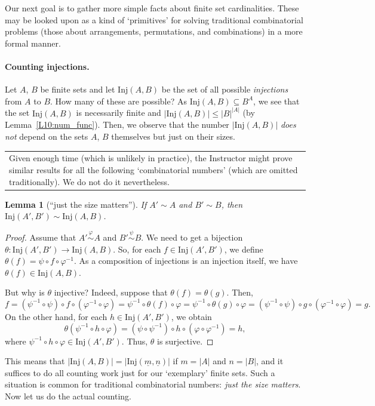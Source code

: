 \documentclass[12pt,notitlepage]{article}
\theoremstyle{plain}
\newtheorem{lemma}[thm]{Lemma}
\theoremstyle{definition}
\theoremstyle{plain}
\newcommand{\sbs}{\subseteq}
\renewcommand{\phi}{\varphi}
\newcommand{\ul}[1]{\underline{#1}}
\newcommand{\1}{\mathbf{1}}
\newcommand{\0}{\mathbf{0}}
\newcommand{\mcomm}[1]{
\medskip\noindent\begin{tabular}{| l}
\parbox{0.99\textwidth}{{\small
#1 }}\end{tabular}
\smallskip}
\begin{document}
Our next goal is to gather more simple facts about finite set cardinalities. These may be looked upon as a kind of `primitives' for solving traditional combinatorial problems (those about arrangements, permutations, and combinations) in a more formal manner.

\paragraph{Counting injections.} Let $A$, $B$ be finite sets and let $\mathrm{Inj}(A,B)$ be the set of all possible \emph{injections} from $A$ to $B$.
How many of these are possible? As $\mathrm{Inj}(A,B) \sbs B^A$, we see that the set $\mathrm{Inj}(A,B)$ is necessarily finite and $|\mathrm{Inj}(A,B)| \leq |B|^{|A|}$ (by Lemma~\ref{L10:num_func}). Then, we observe that the number $|\mathrm{Inj}(A,B)|$ \emph{does not} depend on the sets $A$, $B$ themselves but just on their sizes.

\mcomm{Given enough time (which is unlikely in practice), the Instructor might prove similar results for all the following `combinatorial numbers' (which are omitted traditionally). We do not do it nevertheless.}
\begin{lemma}[``just the size matters'']\label{L11:JSM}
If $A' \sim A$ and $B' \sim B$, then $\mathrm{Inj}(A',B') \sim \mathrm{Inj}(A,B)$.
\end{lemma}
\begin{proof}
Assume that $A' \stackrel{\phi}{\sim} A$ and $B' \stackrel{\psi}{\sim} B$. We need to get a bijection $\theta\colon \mathrm{Inj}(A',B') \to \mathrm{Inj}(A,B)$. So, for each $f \in \mathrm{Inj}(A',B')$, we define $\theta(f) = \psi \circ f \circ \phi^{-1}$. As a composition of injections is an injection itself, we have $\theta(f) \in \mathrm{Inj}(A,B)$.

But why is $\theta$ injective? Indeed, suppose that $\theta(f) = \theta(g)$. Then,
$$f = (\psi^{-1} \circ \psi) \circ f \circ (\phi^{-1} \circ \phi) = \psi^{-1} \circ \theta(f) \circ \phi = \psi^{-1} \circ \theta(g) \circ \phi = (\psi^{-1} \circ \psi) \circ g \circ (\phi^{-1} \circ \phi) = g.$$
On the other hand, for each $h \in \mathrm{Inj}(A',B')$, we obtain
$$\theta(\psi^{-1} \circ h \circ \phi) = (\psi \circ \psi^{-1}) \circ h \circ (\phi \circ \phi^{-1}) = h,$$
where $\psi^{-1} \circ h \circ \phi \in \mathrm{Inj}(A',B')$. Thus, $\theta$ is surjective.
\end{proof}
This means that $|\mathrm{Inj}(A,B)| = |\mathrm{Inj}(\ul{m},\ul{n})|$ if $m = |A|$ and $n = |B|$, and it suffices to do all counting work just for our `exemplary' finite sets. Such a situation is common for traditional combinatorial numbers: \emph{just the size matters}. Now let us do the actual counting.
\end{document}

